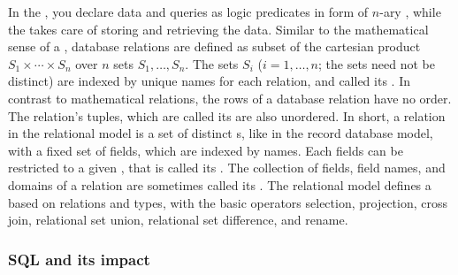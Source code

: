In the , you declare data and queries as 
logic predicates in form of  $n$-ary , while 
the  takes care of storing and retrieving the data. Similar to the
mathematical sense of a , database relations are defined as 
subset of the cartesian product $S_1 \times \cdots \times S_n$ over $n$ sets
$S_1, \ldots, S_n$. The sets $S_i$ ($i=1,\ldots,n$; the sets need not be distinct)
are indexed by unique names for each relation, and called its 
. In contrast to mathematical relations, the
rows of a database relation have no order. The relation's tuples, which are 
called its  are also unordered. In short, a
relation in the relational model is a set of distinct s, like in
the record database model, with a fixed set of fields, which are indexed by 
names. Each fields can be restricted to a given , that is 
called its . The collection of fields, field names, and domains
of a relation are sometimes called its . 
The relational model defines a  based on relations
and types, with the basic operators selection, projection, cross join, 
relational set union, relational set difference, and rename. 


\subsubsection{SQL and its impact}

